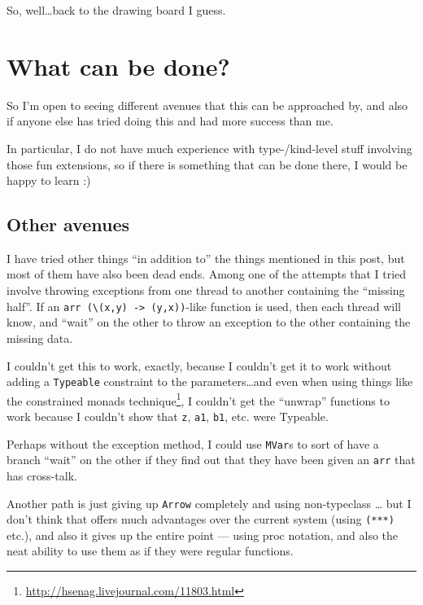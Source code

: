 \documentclass[]{article}
\renewcommand{\href}[2]{#2\footnote{\url{#1}}}
\begin{document}
So, well\ldots back to the drawing board I guess.

\hypertarget{what-can-be-done}{%
\section{What can be done?}\label{what-can-be-done}}

So I'm open to seeing different avenues that this can be approached by, and also
if anyone else has tried doing this and had more success than me.

In particular, I do not have much experience with type-/kind-level stuff
involving those fun extensions, so if there is something that can be done there,
I would be happy to learn :)

\hypertarget{other-avenues}{%
\subsection{Other avenues}\label{other-avenues}}

I have tried other things ``in addition to'' the things mentioned in this post,
but most of them have also been dead ends. Among one of the attempts that I
tried involve throwing exceptions from one thread to another containing the
``missing half''. If an
\texttt{arr\ (\textbackslash{}(x,y)\ -\textgreater{}\ (y,x))}-like function is
used, then each thread will know, and ``wait'' on the other to throw an
exception to the other containing the missing data.

I couldn't get this to work, exactly, because I couldn't get it to work without
adding a \texttt{Typeable} constraint to the parameters\ldots and even when
using things like the
\href{http://hsenag.livejournal.com/11803.html}{constrained monads technique}, I
couldn't get the ``unwrap'' functions to work because I couldn't show that
\texttt{z}, \texttt{a1}, \texttt{b1}, etc. were Typeable.

Perhaps without the exception method, I could use \texttt{MVar}s to sort of have
a branch ``wait'' on the other if they find out that they have been given an
\texttt{arr} that has cross-talk.

Another path is just giving up \texttt{Arrow} completely and using non-typeclass
\ldots{} but I don't think that offers much advantages over the current system
(using \texttt{(***)} etc.), and also it gives up the entire point --- using
proc notation, and also the neat ability to use them as if they were regular
functions.
\end{document}
